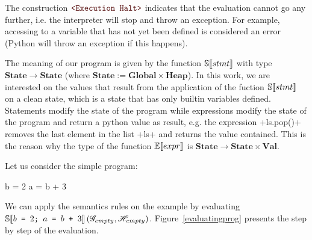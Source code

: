 The construction $\Halt$ indicates that the evaluation cannot go any further, i.e. the
interpreter will stop and throw an exception. For example, accessing to a variable that
has not yet been defined is considered an error (Python will throw an exception if this
happens).

The meaning of our program is given by the function $\mathbb{S}\!\left\llbracket stmt \right\rrbracket$ with type
$\mathbf{State} \to \mathbf{State}$ (where $\mathbf{State} := \mathbf{Global} \times \mathbf{Heap}$).
In this work, we are interested on the values that result from the application of the
fuction $\mathbb{S}\!\left\llbracket stmt \right\rrbracket$ on a clean state, which is a state that has only builtin variables
defined.  Statements modify the state of the program while expressions modify the state of
the program and return a python value as result, e.g. the expression \pycode+ls.pop()+
removes the last element in the list \pycode+ls+ and returns the value contained. This is
the reason why the type of the function $\mathbb{E}\!\left\llbracket expr \right\rrbracket$ is
$\mathbf{State} \to \mathbf{State} \times \mathbf{Val}$.

Let us consider the simple program:

\begin{pythoncode}
b = 2
a = b + 3
\end{pythoncode}

We can apply the semantics rules on the example by evaluating
$\mathbb{S}\!\left\llbracket b \texttt{ = } 2\texttt{; } a \texttt{ = } b \texttt{ + } 3 \right\rrbracket\left(\mathscr{G}_{empty}, \mathscr{H}_{empty}\right)$.
Figure~\ref{evaluatingprog} presents the step by step of the evaluation.


